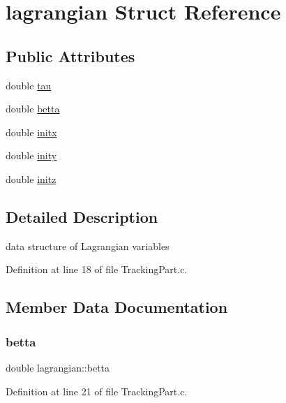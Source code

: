 \hypertarget{structlagrangian}{}\section{lagrangian Struct Reference}
\label{structlagrangian}
\subsection*{Public Attributes}
\begin{DoxyCompactItemize}
\item 
double \mbox{\hyperlink{structlagrangian_a6c0717ffd474442f1651a1f7ebec625f}{tau}}
\item 
double \mbox{\hyperlink{structlagrangian_ad5fabc5bfeccc6ba7e60fbdf966c21d7}{betta}}
\item 
double \mbox{\hyperlink{structlagrangian_aa3a20ad03006649a17790bd31560af8f}{initx}}
\item 
double \mbox{\hyperlink{structlagrangian_a75fb1c376f05bb7ba3eaee13cab24067}{inity}}
\item 
double \mbox{\hyperlink{structlagrangian_a44e890e0ddb81f46f4aa3c1e7c029a73}{initz}}
\end{DoxyCompactItemize}


\subsection{Detailed Description}
data structure of Lagrangian variables 

Definition at line 18 of file Tracking\+Part.\+c.



\subsection{Member Data Documentation}
\mbox{\label{structlagrangian_ad5fabc5bfeccc6ba7e60fbdf966c21d7}} 
\subsubsection{\texorpdfstring{betta}{betta}}
{\footnotesize\ttfamily double lagrangian\+::betta}



Definition at line 21 of file Tracking\+Part.\+c.

\mbox{\label{structlagrangian_aa3a20ad03006649a17790bd31560af8f}} 
